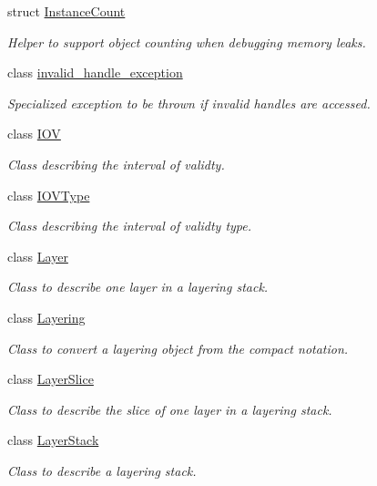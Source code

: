 \begin{DoxyCompactItemize}
struct \hyperlink{struct_d_d4hep_1_1_instance_count}{Instance\+Count}
\begin{DoxyCompactList}\small\item\em Helper to support object counting when debugging memory leaks. \end{DoxyCompactList}\item 
class \hyperlink{class_d_d4hep_1_1invalid__handle__exception}{invalid\+\_\+handle\+\_\+exception}
\begin{DoxyCompactList}\small\item\em Specialized exception to be thrown if invalid handles are accessed. \end{DoxyCompactList}\item 
class \hyperlink{class_d_d4hep_1_1_i_o_v}{I\+OV}
\begin{DoxyCompactList}\small\item\em Class describing the interval of validty. \end{DoxyCompactList}\item 
class \hyperlink{class_d_d4hep_1_1_i_o_v_type}{I\+O\+V\+Type}
\begin{DoxyCompactList}\small\item\em Class describing the interval of validty type. \end{DoxyCompactList}\item 
class \hyperlink{class_d_d4hep_1_1_layer}{Layer}
\begin{DoxyCompactList}\small\item\em Class to describe one layer in a layering stack. \end{DoxyCompactList}\item 
class \hyperlink{class_d_d4hep_1_1_layering}{Layering}
\begin{DoxyCompactList}\small\item\em Class to convert a layering object from the compact notation. \end{DoxyCompactList}\item 
class \hyperlink{class_d_d4hep_1_1_layer_slice}{Layer\+Slice}
\begin{DoxyCompactList}\small\item\em Class to describe the slice of one layer in a layering stack. \end{DoxyCompactList}\item 
class \hyperlink{class_d_d4hep_1_1_layer_stack}{Layer\+Stack}
\begin{DoxyCompactList}\small\item\em Class to describe a layering stack. \end{DoxyCompactList}\item 

\end{DoxyCompactItemize}
